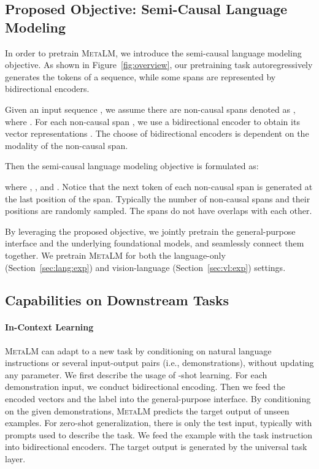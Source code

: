 \documentclass{article}
\theoremstyle{plain}
\theoremstyle{definition}
\theoremstyle{remark}
\newcommand\ours{\textsc{MetaLM}}
\begin{document}
\subsection{Proposed Objective: Semi-Causal Language Modeling}
\label{sec:sclm}

In order to pretrain \ours{}, we introduce the semi-causal language modeling objective.
As shown in Figure~\ref{fig:overview}, our pretraining task autoregressively generates the tokens of a sequence, while some spans are represented by bidirectional encoders.

Given an input sequence , we assume there are  non-causal spans denoted as , where .
For each non-causal span , we use a bidirectional encoder to obtain its vector representations .
The choose of bidirectional encoders is dependent on the modality of the non-causal span.

Then the semi-causal language modeling objective is formulated as:

where , , and .
Notice that the next token of each non-causal span is generated at the last position of the span.
Typically the number of non-causal spans and their positions are randomly sampled. The spans do not have overlaps with each other.

By leveraging the proposed objective, we jointly pretrain the general-purpose interface and the underlying foundational models, and seamlessly connect them together.
We pretrain \ours{} for both the language-only (Section~\ref{sec:lang:exp}) and vision-language (Section~\ref{sec:vl:exp}) settings.


\subsection{Capabilities on Downstream Tasks}

\paragraph{In-Context Learning}
\ours{} can adapt to a new task by conditioning on natural language instructions or several input-output pairs (i.e., demonstrations), without updating any parameter.
We first describe the usage of -shot learning.
For each demonstration input, we conduct bidirectional encoding.
Then we feed the encoded vectors and the label into the general-purpose interface.
By conditioning on the given demonstrations, \ours{} predicts the target output of unseen examples.
For zero-shot generalization, there is only the test input, typically with prompts used to describe the task.
We feed the example with the task instruction into bidirectional encoders. The target output is generated by the universal task layer.
\end{document}
